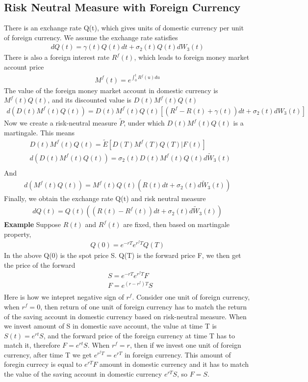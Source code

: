 \documentclass[a4paper]{article}
\begin{document}
\subsection{Risk Neutral Measure with Foreign Currency}
There is an exchange rate Q(t), which gives units of domestic currency per unit of foreign currency. We assume the exchange rate satisfies
\begin{align*}
	dQ(t) = \gamma(t)Q(t)dt + \sigma_2(t)Q(t)dW_3(t)
\end{align*}
There is also a foreign interest rate $R^f(t)$, which leads to foreign money market account price
\begin{align*}
	M^f(t) = e^{\int_0^t R^f(u) du}
\end{align*}
The value of the foreign money market account in domestic currency is $M^f(t)Q(t)$, and its discounted value is $D(t)M^f(t)Q(t)$
\begin{align*}
	d(D(t)M^f(t)Q(t)) = D(t)M^f(t)Q(t)[(R^f - R(t) + \gamma(t))dt + \sigma_2(t) dW_3(t)]
\end{align*}
Now we create a risk-neutral measure $\tilde P$, under which $D(t)M^f(t)Q(t)$ is a martingale. This means
\begin{align*}
	& D(t)M^f(t)Q(t) = \tilde E[D(T)M^f(T)Q(T)|F(t)] \\
	& d(D(t)M^f(t)Q(t)) = \sigma_2(t) D(t)M^f(t)Q(t)d\tilde W_3(t) \\
\end{align*}
And
\begin{align*}
	d(M^f(t)Q(t)) = M^f(t)Q(t)(R(t)dt + \sigma_2(t) d\tilde W_3(t))
\end{align*}
Finally, we obtain the exchange rate Q(t) and risk neutral measure
\begin{align*}
	dQ(t) = Q(t)((R(t) - R^f(t))dt + \sigma_2(t) d\tilde W_3(t))
\end{align*}
{\bf Example}
Suppose $R(t)$ and $R^f(t)$ are fixed, then based on martingale property, 
\begin{align*}
	Q(0) = e^{-rT} e^{r^fT}Q(T)
\end{align*}
In the above Q(0) is the spot price S. Q(T) is the forward price F, we then get the price of the forward
\begin{align*}
	& S = e^{-rT} e^{r^fT}F \\
	& F = e^{(r - r^f)T}S \\
\end{align*}
Here is how we intepret negative sign of $r^f$. Consider one unit of foreign currency, when $r^f = 0$, then return of one unit of foreign currency has to match the return of the saving account in domestic currency based on risk-neutral measure. When we invest amount of S in domestic save account, the value at time T is $S(t) = e^{rt}S$, and the forward price of the foreign currency at time T has to match it, therefore $F = e^{rt} S$. When $r^f = r$, then if we invest one unit of foreign currency, after time T we get $e^{r^fT} = e^{rT}$ in foreign currency. This amount of foregin currecy is equal to $e^{rT}F$ amount in domestic currency and it has to match the value of the saving account in domestic currency $e^{rT}S$, so $F = S$.
\end{document}
